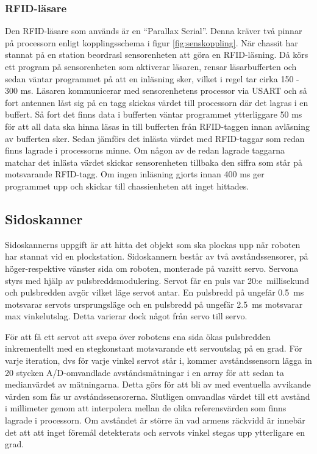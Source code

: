 \subsubsection{RFID-läsare}
Den RFID-läsare som används är en “Parallax Serial”. Denna kräver två pinnar på processorn enligt kopplingsschema i figur \ref{fig:senskoppling}. När chassit har stannat på en station beordrasl sensorenheten att göra en RFID-läsning. Då körs ett program på sensorenheten som aktiverar läsaren, rensar läsarbufferten och sedan väntar programmet på att en inläsning sker, vilket i regel tar cirka 150 - 300 ms. Läsaren kommunicerar med sensorenhetens processor via USART och så fort antennen låst sig på en tagg skickas värdet till processorn där det lagras i en buffert. Så fort det finns data i bufferten väntar programmet ytterliggare 50 ms för att all data ska hinna läsas in till bufferten från RFID-taggen innan avläsning av bufferten sker. Sedan jämförs det inlästa värdet med RFID-taggar som redan finns lagrade i processorns minne. Om någon av de redan lagrade taggarna matchar det inlästa värdet skickar sensorenheten tillbaka den siffra som står på motsvarande RFID-tagg. Om ingen inläsning gjorts innan 400 ms ger programmet upp och skickar till chassienheten att inget hittades.

\subsection{Sidoskanner}
Sidoskannerns uppgift är att hitta det objekt som ska plockas upp när roboten har stannat vid en plockstation. Sidoskannern består av två avståndssensorer, på höger-respektive vänster sida om roboten, monterade på varsitt servo. Servona styrs med hjälp av pulsbreddsmodulering. Servot får en puls var 20:e~millisekund och pulsbredden avgör vilket läge servot antar. En pulsbredd på ungefär 0.5~ms motsvarar servots ursprungsläge och en pulsbredd på ungefär 2.5~ms motsvarar max vinkelutslag. Detta varierar dock något från servo till servo.

För att få ett servot att svepa över robotens ena sida ökas pulsbredden inkrementellt med en stegkonstant motsvarande ett servoutslag på en grad. För varje iteration, dvs för varje vinkel servot står i, kommer avståndssensorn lägga in 20 stycken A/D-omvandlade avståndsmätningar i en array för att sedan ta medianvärdet av mätningarna. Detta görs för att bli av med eventuella avvikande värden som fås ur avståndssensorerna. Slutligen omvandlas värdet till ett avstånd i millimeter genom att interpolera mellan de olika referensvärden som finns lagrade i processorn. Om avståndet är större än vad armens räckvidd är innebär det att att inget föremål detekterats och servots vinkel stegas upp ytterligare en grad. 

